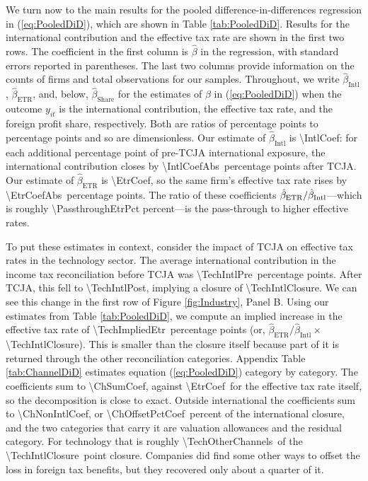 \documentclass[11pt,letterpaper]{article}
\newcommand{\ShareNum}[1]{\num[round-mode=places,round-precision=1]{#1}}
\newcommand{\CoefNum}[1]{\num[round-mode=places,round-precision=3]{#1}}
\newcommand{\RoundNum}[1]{\num[round-mode=places,round-precision=0]{#1}}
\begin{document}
We turn now to the main results for the pooled difference-in-differences
regression in (\ref{eq:PooledDiD}), which are shown in Table \ref{tab:PooledDiD}.
Results for the international contribution and the effective tax rate
are shown in the first two rows. The coefficient in the first column is
$\hat\beta$ in the regression, with standard errors reported in parentheses.
The last two columns provide information on the counts of 
firms and total observations
for our samples.
Throughout, we write $\hat\beta_{\text{Intl}}$,
$\hat\beta_{\text{ETR}}$, and, below, $\hat\beta_{\text{Share}}$
for the estimates of $\beta$ in (\ref{eq:PooledDiD}) when the outcome
$y_{it}$ is the international contribution, the effective tax rate, and
the foreign profit share, respectively.
Both are ratios of percentage points to percentage points and so are
dimensionless. Our estimate of $\hat\beta_{\text{Intl}}$ is
\CoefNum{\IntlCoef}: for each additional percentage point of pre-TCJA
international exposure, the international contribution closes by
\CoefNum{\IntlCoefAbs}\ percentage points after TCJA. Our estimate of
$\hat\beta_{\text{ETR}}$ is \CoefNum{\EtrCoef}, so the same firm's
effective tax rate rises by \CoefNum{\EtrCoefAbs}\ percentage points.
The ratio of these coefficients $\hat\beta_{\rm ETR}/\hat \beta_{\rm Intl}$---which
is roughly \RoundNum{\PassthroughEtrPct} percent---is the pass-through
to higher effective rates.

To put these estimates in context, consider the impact of TCJA on effective tax
rates in the technology sector. 
The average international contribution in the income tax reconciliation before TCJA was 
\ShareNum{\TechIntlPre}\ percentage points. After TCJA, this fell to
\ShareNum{\TechIntlPost}, implying a closure of 
\ShareNum{\TechIntlClosure}.  We can see this change in the first row of Figure 
\ref{fig:Industry}, Panel B. 
Using our estimates from Table \ref{tab:PooledDiD}, we compute an
implied increase in the effective tax rate of
\ShareNum{\TechImpliedEtr}\ percentage points
(or, $\hat\beta_{\text{ETR}}/\hat\beta_{\text{Intl}} \times$ \ShareNum{\TechIntlClosure}).
This is smaller than the closure itself because part of it is returned
through the other reconciliation categories. Appendix Table \ref{tab:ChannelDiD}
estimates equation (\ref{eq:PooledDiD}) category by category. The
coefficients sum to \CoefNum{\ChSumCoef}, against
\CoefNum{\EtrCoef}\ for the effective tax rate itself, so the
decomposition is close to exact. Outside international the coefficients
sum to \CoefNum{\ChNonIntlCoef}, or
\RoundNum{\ChOffsetPctCoef}\ percent of the international closure, and the
two categories that carry it are valuation allowances and the residual
category. For technology that is roughly
\ShareNum{\TechOtherChannels}\ of the
\ShareNum{\TechIntlClosure}\ point closure. Companies did find some
other ways to offset the loss in foreign tax benefits, but they
recovered only about a quarter of it.
\end{document}

